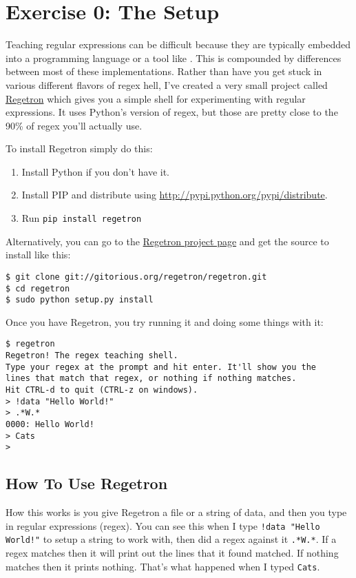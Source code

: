 \chapter{Exercise 0: The Setup}

Teaching regular expressions can be difficult because they are typically embedded into 
a programming language or a tool like .  This is compounded by differences
between most of these implementations.  Rather than have you get stuck in various 
different flavors of regex hell, I've created a very small project called 
\href{https://gitorious.org/regetron}{Regetron} which gives you a simple shell
for experimenting with regular expressions.  It uses Python's version of regex, but
those are pretty close to the 90\% of regex you'll actually use.

To install Regetron simply do this:

\begin{enumerate}
\item Install Python if you don't have it.
\item Install PIP and distribute using \href{http://pypi.python.org/pypi/distribute}{http://pypi.python.org/pypi/distribute}.
\item Run \verb|pip install regetron|
\end{enumerate}

Alternatively, you can go to the \href{https://gitorious.org/regetron}{Regetron project page}
and get the source to install like this:

\begin{lstlisting}
$ git clone git://gitorious.org/regetron/regetron.git
$ cd regetron
$ sudo python setup.py install
\end{lstlisting}

Once you have Regetron, you try running it and doing some things with it:

\begin{lstlisting}
$ regetron
Regetron! The regex teaching shell.
Type your regex at the prompt and hit enter. It'll show you the
lines that match that regex, or nothing if nothing matches.
Hit CTRL-d to quit (CTRL-z on windows).
> !data "Hello World!"
> .*W.*
0000: Hello World!
> Cats
> 
\end{lstlisting}


\section{How To Use Regetron}

How this works is you give Regetron a file or a string of data, and then you
type in regular expressions (regex).  You can see this when I type \verb|!data "Hello World!"|
to setup a string to work with, then did a regex against it
\verb|.*W.*|.  If a regex matches then it will print out the lines that it
found matched.  If nothing matches then it prints nothing.  That's what 
happened when I typed \verb|Cats|.

